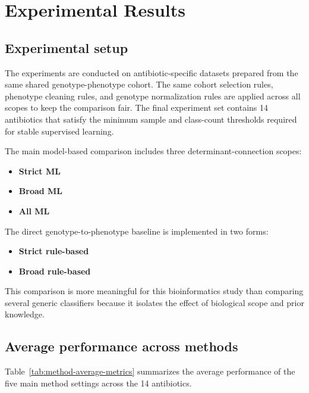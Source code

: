\section{Experimental Results}

\subsection{Experimental setup}

The experiments are conducted on antibiotic-specific datasets prepared from the same shared genotype-phenotype cohort. The same cohort selection rules, phenotype cleaning rules, and genotype normalization rules are applied across all scopes to keep the comparison fair. The final experiment set contains 14 antibiotics that satisfy the minimum sample and class-count thresholds required for stable supervised learning.

The main model-based comparison includes three determinant-connection scopes:

\begin{itemize}
    \item \textbf{Strict ML}
    \item \textbf{Broad ML}
    \item \textbf{All ML}
\end{itemize}

The direct genotype-to-phenotype baseline is implemented in two forms:

\begin{itemize}
    \item \textbf{Strict rule-based}
    \item \textbf{Broad rule-based}
\end{itemize}

This comparison is more meaningful for this bioinformatics study than comparing several generic classifiers because it isolates the effect of biological scope and prior knowledge.

\subsection{Average performance across methods}

Table~\ref{tab:method-average-metrics} summarizes the average performance of the five main method settings across the 14 antibiotics.


